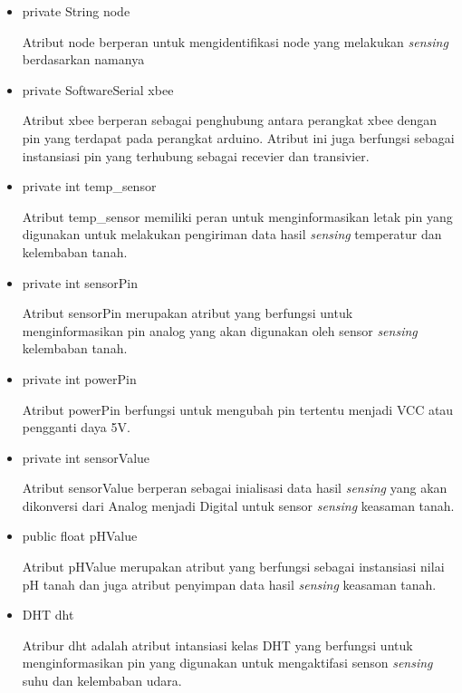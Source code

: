     \begin{itemize}
        \item private String node
        
        Atribut node berperan untuk mengidentifikasi node yang melakukan \textit{sensing} berdasarkan namanya
        
        \item private SoftwareSerial xbee
        
        Atribut xbee berperan sebagai penghubung antara perangkat xbee dengan pin yang terdapat pada perangkat arduino. Atribut ini juga berfungsi sebagai instansiasi pin yang terhubung sebagai recevier dan transivier.
        
        \item private int temp\_sensor
        
        Atribut temp\_sensor memiliki peran untuk menginformasikan letak pin yang digunakan untuk melakukan pengiriman data hasil \textit{sensing} temperatur dan kelembaban tanah.
        
        \item private int sensorPin
        
        Atribut sensorPin merupakan atribut yang berfungsi untuk menginformasikan pin analog yang akan digunakan oleh sensor \textit{sensing} kelembaban tanah.
        
        \item private int powerPin
        
        Atribut powerPin berfungsi untuk mengubah pin tertentu menjadi VCC atau pengganti daya 5V.
        
        
        \item private int sensorValue
        
        Atribut sensorValue berperan sebagai inialisasi data hasil \textit{sensing} yang akan dikonversi dari Analog menjadi Digital untuk sensor \textit{sensing} keasaman tanah.
        
        \item public float pHValue
        
        Atribut pHValue merupakan atribut yang berfungsi sebagai instansiasi nilai pH tanah dan juga atribut penyimpan data hasil \textit{sensing} keasaman tanah.
        
        
        \item DHT dht
        
        Atribur dht adalah atribut intansiasi kelas DHT yang berfungsi untuk menginformasikan pin yang digunakan untuk mengaktifasi senson \textit{sensing} suhu dan kelembaban udara.
        
        
        
        
    \end{itemize}
    
